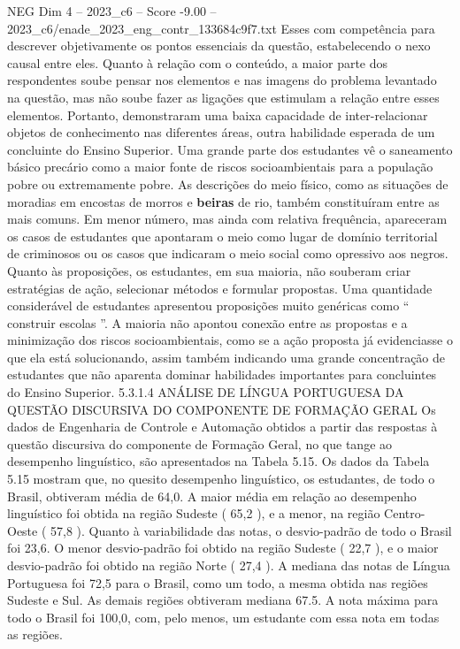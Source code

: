 \begin{textsample}{NEG Dim 4 – 2023\_c6 – Score -9.00 – 2023\_c6/enade\_2023\_eng\_contr\_133684c9f7.txt}
Esses com competência para descrever objetivamente os pontos essenciais da questão, estabelecendo o nexo causal entre eles.
Quanto à relação com o conteúdo, a maior parte dos respondentes soube pensar nos elementos e nas imagens do problema levantado na questão, mas não soube fazer as ligações que estimulam a relação entre esses elementos.
Portanto, demonstraram uma baixa capacidade de inter-relacionar objetos de conhecimento nas diferentes áreas, outra habilidade esperada de um concluinte do Ensino Superior.
Uma grande parte dos estudantes vê o saneamento básico precário como a maior fonte de riscos socioambientais para a população pobre ou extremamente pobre.
As descrições do meio físico, como as situações de moradias em encostas de morros e \textbf{beiras} de rio, também constituíram entre as mais comuns.
Em menor número, mas ainda com relativa frequência, apareceram os casos de estudantes que apontaram o meio como lugar de domínio territorial de criminosos ou os casos que indicaram o meio social como opressivo aos negros.
Quanto às proposições, os estudantes, em sua maioria, não souberam criar estratégias de ação, selecionar métodos e formular propostas.
Uma quantidade considerável de estudantes apresentou proposições muito genéricas como “ construir escolas ”.
A maioria não apontou conexão entre as propostas e a minimização dos riscos socioambientais, como se a ação proposta já evidenciasse o que ela está solucionando, assim também indicando uma grande concentração de estudantes que não aparenta dominar habilidades importantes para concluintes do Ensino Superior. 5.3.1.4 ANÁLISE DE LÍNGUA PORTUGUESA DA QUESTÃO DISCURSIVA DO COMPONENTE DE FORMAÇÃO GERAL Os dados de Engenharia de Controle e Automação obtidos a partir das respostas à questão discursiva do componente de Formação Geral, no que tange ao desempenho linguístico, são apresentados na Tabela 5.15.
Os dados da Tabela 5.15 mostram que, no quesito desempenho linguístico, os estudantes, de todo o Brasil, obtiveram média de 64,0.
A maior média em relação ao desempenho linguístico foi obtida na região Sudeste ( 65,2 ), e a menor, na região Centro-Oeste ( 57,8 ).
Quanto à variabilidade das notas, o desvio-padrão de todo o Brasil foi 23,6.
O menor desvio-padrão foi obtido na região Sudeste ( 22,7 ), e o maior desvio-padrão foi obtido na região Norte ( 27,4 ).
A mediana das notas de Língua Portuguesa foi 72,5 para o Brasil, como um todo, a mesma obtida nas regiões Sudeste e Sul.
As demais regiões obtiveram mediana 67.5.
A nota máxima para todo o Brasil foi 100,0, com, pelo menos, um estudante com essa nota em todas as regiões.

\end{textsample}
